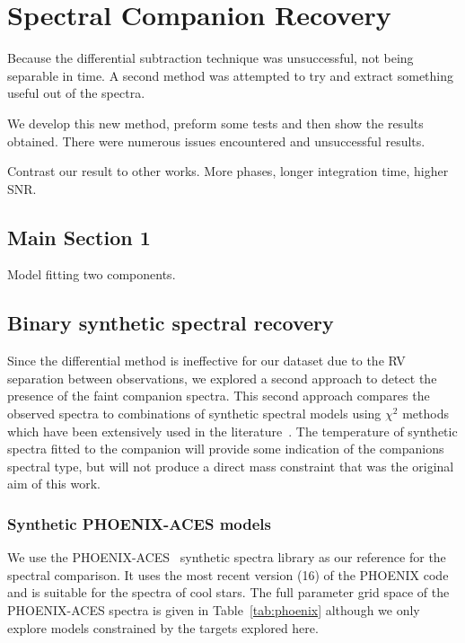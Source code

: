 
\chapter{Spectral Companion Recovery}  %

\label{cha:model_comparison}


Because the differential subtraction technique was unsuccessful, not being separable in time. A second method was attempted to try and extract something useful out of the spectra.

We develop this new method, preform some tests and then show the results obtained. There were numerous issues encountered and unsuccessful results.

Contrast our result to other works.  More phases, longer integration time, higher SNR.




\section{Main Section 1}
Model fitting two components.




\section{Binary synthetic spectral recovery}
\label{subsec:companion_recovery}
Since the differential method is ineffective for our dataset due to the RV separation between observations, we explored a second approach to detect the presence of the faint companion spectra. This second approach compares the observed spectra to combinations of synthetic spectral models using \(\chi^{2}\) methods which have been extensively used in the literature~\citep[e.g.][]{astudillo-defru_harps_2015, passegger_fundamental_2016, zechmeister_spectrum_2018,nemravova_xtauri_2016}. {\rd{} The temperature of synthetic spectra fitted to  the companion will provide some indication of the companions spectral type, but will not produce a direct mass constraint that was the original aim of this work.}

\subsection{Synthetic PHOENIX-ACES models}
\label{subsec:spec_models}
We use the PHOENIX-ACES~\citep{husser_new_2013} synthetic spectra library as our reference for the spectral comparison. It uses the most recent version (16) of the PHOENIX code and is suitable for the spectra of cool stars. The full parameter grid space of the PHOENIX-ACES spectra is given in Table~\ref{tab:phoenix} although we only explore models constrained by the targets explored here.

